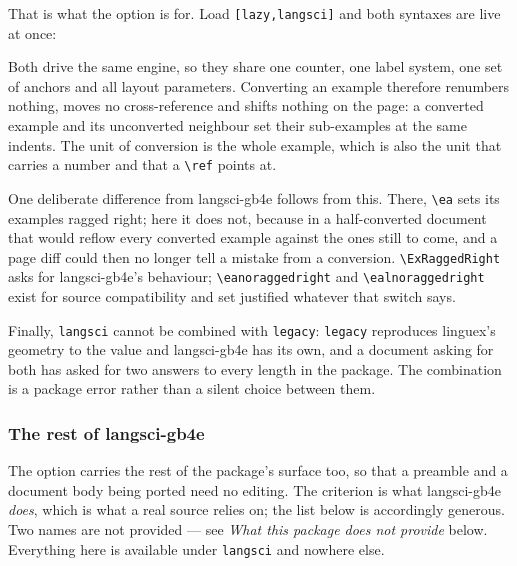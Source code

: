 \documentclass[11pt,a4paper]{article}
\newcommand{\cs}[1]{\texttt{\textbackslash #1}}
\newcommand{\pkg}[2][]{\textsf{#2}}
\newcommand{\opt}[1]{\texttt{#1}}
\begin{document}
That is what the option is for. Load \opt{[lazy,langsci]} and both
syntaxes are live at once:

\begin{code}
\usepackage[lazy,langsci]{linguexx}
\end{code}

\noindent Both drive the same engine, so they share one counter, one
label system, one set of anchors and all layout parameters. Converting an
example therefore renumbers nothing, moves no cross-reference and shifts
nothing on the page: a converted example and its unconverted neighbour set
their sub-examples at the same indents. The unit of conversion is the
whole example, which is also the unit that carries a number and that a
\cs{ref} points at.

One deliberate difference from \pkg{langsci-gb4e} follows from this.
There, \cs{ea} sets its examples ragged right; here it does not, because
in a half-converted document that would reflow every converted example
against the ones still to come, and a page diff could then no longer tell
a mistake from a conversion. \cs{ExRaggedRight} asks for
\pkg{langsci-gb4e}'s behaviour; \cs{eanoraggedright} and
\cs{ealnoraggedright} exist for source compatibility and set justified
whatever that switch says.

Finally, \opt{langsci} cannot be combined with \opt{legacy}: \opt{legacy}
reproduces \pkg{linguex}'s geometry to the value and \pkg{langsci-gb4e}
has its own, and a document asking for both has asked for two answers to
every length in the package. The combination is a package error rather
than a silent choice between them.

\subsubsection*{The rest of \pkg{langsci-gb4e}}

The option carries the rest of the package's surface too, so that a preamble
and a document body being ported need no editing. The criterion is what
\pkg{langsci-gb4e} \emph{does}, which is what a real source relies on;
the list below is accordingly generous. Two names are not provided --- see
\emph{What this package does not provide} below. Everything here is
available under \opt{langsci} and nowhere else.
\end{document}
